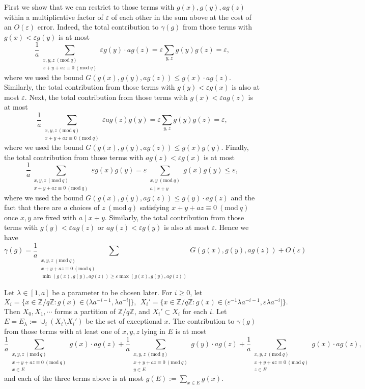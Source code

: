 \documentclass[12pt, notitlepage]{amsart}
\numberwithin{equation}{section}
\def\Z{\mathbb Z}
\newcommand{\eps}{\varepsilon}
\newcommand{\Mod}[1]{\ (\mathrm{mod}\ #1)}
\theoremstyle{remark}
\theoremstyle{definition}
\theoremstyle{remark}
\numberwithin{equation}{section}
\begin{document}
First we show that we can restrict to those terms with $g(x), g(y), ag(z)$ within a multiplicative factor of $\eps$ of each other in the sum above at the cost of an $O(\eps)$ error. 
Indeed, the total contribution to $\gamma(g)$ from those terms with $g(x) < \eps g(y)$ is at most
$$
\frac{1}{a} \sum_{\substack{x,y,z\Mod{q}\\ x+y+az\equiv 0\Mod{q}}} \eps g(y)\cdot ag(z) = \eps \sum_{y,z} g(y) g(z) = \eps,
$$
where we used the bound $G(g(x), g(y), ag(z)) \leq g(x) \cdot ag(z)$. Similarly, the total contribution from those terms with $g(y) < \eps g(x)$ is also at most $\eps$. Next, the total contribution from those terms with $g(x) < \eps ag(z)$ is at most
$$
\frac{1}{a} \sum_{\substack{x,y,z\Mod{q}\\ x+y+az\equiv 0\Mod{q}}} \eps ag(z) g(y) = \eps \sum_{y,z} g(y)g(z) = \eps,
$$
where we used the bound $G(g(x), g(y), ag(z)) \leq g(x)g(y)$. Finally, the total contribution from those terms with $ag(z) < \eps g(x)$ is at most
$$
\frac{1}{a} \sum_{\substack{x,y,z\Mod{q}\\ x+y+az\equiv 0\Mod{q}}} \eps g(x) g(y) = \eps \sum_{\substack{x,y\Mod{q} \\ a \mid x+y}} g(x) g(y) \leq \eps,
$$
where we used the bound $G(g(x), g(y), ag(z)) \leq g(y) \cdot ag(z)$ and the fact that there are $a$ choices of $z\Mod{q}$ satisfying $x+y+az\equiv 0\Mod{q}$ once $x,y$ are fixed with $a\mid x+y$. Similarly, the total contribution from those terms with $g(y) < \eps ag(z)$ or $ag(z) < \eps g(y)$ is also at most $\eps$. Hence we have
$$
\gamma(g) = \frac{1}{a} \sum_{\substack{x,y,z\Mod{q}\\ x+y+az\equiv 0\Mod{q} \\ \min(g(x), g(y), ag(z)) \geq \eps \max(g(x),g(y),ag(z))}} G(g(x), g(y), ag(z)) + O(\eps)
$$

Let $\lambda \in [1,a]$ be a parameter to be chosen later. For $i \geq 0$, let 
$$
X_i = \{x \in \Z/q\Z: g(x) \in (\lambda a^{-i-1}, \lambda a^{-i}]\}, \ \ X_i' = \{x \in \Z/q\Z: g(x) \in (\eps^{-1}\lambda a^{-i-1}, \eps \lambda a^{-i}]\}.
$$
Then $X_0,X_1,\cdots$ forms a partition of $\Z/q\Z$, and $X_i' \subset X_i$ for each $i$. Let $E = E_{\lambda}:= \cup_i (X_i\setminus X_i')$ be the set of exceptional $x$. The contribution to $\gamma(g)$ from those terms with at least one of $x,y,z$ lying in $E$ is at most
$$
\frac{1}{a}\sum_{\substack{x,y,z\Mod{q} \\ x+y+az\equiv 0\Mod{q} \\ x \in E}} g(x) \cdot ag(z) + \frac{1}{a}\sum_{\substack{x,y,z\Mod{q} \\ x+y+az\equiv 0\Mod{q} \\ y \in E}} g(y) \cdot ag(z) + \frac{1}{a}\sum_{\substack{x,y,z\Mod{q} \\ x+y+az\equiv 0\Mod{q} \\ z \in E}} g(x) \cdot ag(z),
$$
and each of the three terms above is at most $g(E) := \sum_{x \in E}g(x)$.
\end{document}
